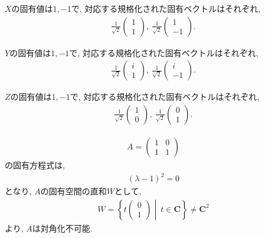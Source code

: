 \begin{ex}
    \label{ex2.11}
    $X$の固有値は$1,-1$で, 対応する規格化された固有ベクトルはそれぞれ,
    \begin{align*}
        \frac{1}{\sqrt{2}}
        \begin{pmatrix}
            1 \\ 1
        \end{pmatrix}
        ,\
        \frac{1}{\sqrt{2}}
        \begin{pmatrix}
            1 \\ -1
        \end{pmatrix}.
    \end{align*}

    $Y$の固有値は$1,-1$で, 対応する規格化された固有ベクトルはそれぞれ,
    \begin{align*}
        \frac{1}{\sqrt{2}}
        \begin{pmatrix}
            i \\ 1
        \end{pmatrix}
        ,\
        \frac{1}{\sqrt{2}}
        \begin{pmatrix}
            i \\ -1
        \end{pmatrix}.
    \end{align*}

    $Z$の固有値は$1,-1$で, 対応する規格化された固有ベクトルはそれぞれ,
    \begin{align*}
        \frac{1}{\sqrt{2}}
        \begin{pmatrix}
            1 \\ 0
        \end{pmatrix}
        ,\
        \frac{1}{\sqrt{2}}
        \begin{pmatrix}
            0 \\ 1
        \end{pmatrix}.
    \end{align*}
\end{ex}

\begin{ex}
    \label{ex2.12}
    \begin{align*}
        A =
        \begin{pmatrix}
            1 & 0 \\
            1 & 1
        \end{pmatrix}
    \end{align*}
    の固有方程式は,
    \begin{align*}
        (\lambda-1)^2=0
    \end{align*}
    となり, $A$の固有空間の直和$W$として,
    \begin{align*}
        W =
        \left\{
        t
        \begin{pmatrix}
            0 \\1
        \end{pmatrix}
        \middle| \ t \in \bm{C}
        \right\}
        \neq \bm{C}^2
    \end{align*}
    より, $A$は対角化不可能.
\end{ex}


